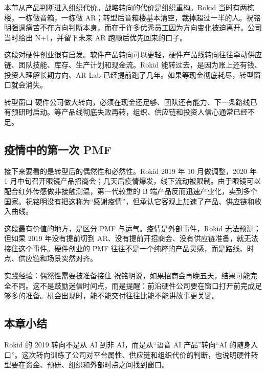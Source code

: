 本节从产品判断进入组织代价。战略转向的代价是组织重构。Rokid 当时有两栋楼，一栋做音箱，一栋做 AR；转型后音箱楼基本清空，裁掉超过一半的人。祝铭明强调痛苦不在方向判断本身，而在于许多优秀员工因为方向变化被迫离开。公司当时给出 N+1，并留下未来 AR 跑顺后优先回来的口子。

这段对硬件创业很有启发。软件产品转向可以更轻，硬件产品线转向往往牵动供应链、团队技能、库存、生产计划和现金流。Rokid 能转过去，是因为账上还有钱、投资人理解长期方向、AR Lab 已经提前跑了几年。如果等现金彻底耗尽，转型窗口就会消失。

\begin{importantbox}{转型窗口}
硬件公司做大转向，必须在现金还足够、团队还有能力、下一条路线已有预研时启动。等产品线彻底失败再转，组织、供应链和投资人信心通常已经不足。
\end{importantbox}

\subsection{疫情中的第一次 PMF}

接下来要看的是转型后的偶然性和必然性。Rokid 2019 年 10 月做调整，2020 年 1 月中旬召开眼镜产品招商会；几天后疫情爆发，线下流动被限制。由于眼镜可以配合红外传感做非接触测温，第一代较重的 B 端产品反而迅速产业化，卖到多个国家。祝铭明没有把这称为“感谢疫情”，但承认它客观上加速了产品、供应链和收入曲线。

这段最有价值的地方，是区分 PMF 与运气。疫情是外部事件，Rokid 无法预测；但如果 2019 年没有提前切到 AR、没有提前开招商会、没有供应链准备，就无法接住这个事件。硬件创业的 PMF 往往不是一个纯粹的产品灵感，而是路线、时点、供应链和场景突然对齐。

\begin{knowledgebox}{实践经验：偶然性需要被准备接住}
祝铭明说，如果招商会再晚五天，结果可能完全不同。这不是鼓励迷信时间点，而是提醒：前沿硬件公司要在窗口打开前完成足够多的准备。机会出现时，能不能交付往往比能不能讲故事更关键。
\end{knowledgebox}

\subsection{本章小结}

Rokid 的 2019 转向不是从 AI 到非 AI，而是从“语音 AI 产品”转向“AI 的随身入口”。这次转向训练了公司对平台属性、供应链和组织代价的判断，也说明硬件转型要在资金、预研、组织和外部时点之间找到窗口。

